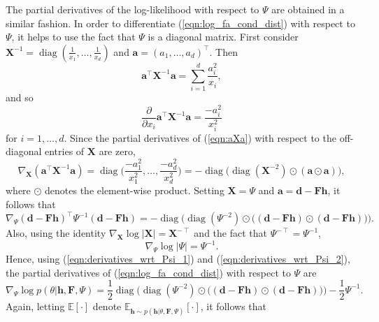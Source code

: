 \documentclass[msc,deptreport.inf]{infthesis} %
\newcommand{\matr}[1]{\mathbf{#1}}
\newcommand{\E}{\mathbb E}
\newcommand{\diag}{\mathop{\mathrm{diag}}}
\begin{document}
The partial derivatives of the log-likelihood with respect to $\Psi$ are obtained in a similar fashion. In order to differentiate (\ref{eqn:log_fa_cond_dist}) with respect to $\Psi$, it helps to use the fact that $\Psi$ is a diagonal matrix. First consider $\matr{X}^{-1} = \diag(\frac{1}{x_1}, \dots, \frac{1}{x_d})$ and $\matr{a} = (a_1, \dots, a_d)^\intercal$. Then 
\begin{equation}\label{eqn:aXa}
	\matr{a}^\intercal \matr{X}^{-1} \matr{a} = \sum_{i=1}^d \frac{a_i^2}{x_i},
\end{equation}
and so
\begin{equation}
	\frac{\partial}{\partial x_i} \matr{a}^\intercal \matr{X}^{-1} \matr{a} = \frac{-a_i^2}{x_i^2}
\end{equation}
for $i=1, \dots, d$. Since the partial derivatives of (\ref{eqn:aXa}) with respect to the off-diagonal entries of $\matr{X}$ are zero, 
\begin{equation}
	\nabla_\matr{X} (\matr{a}^\intercal \matr{X}^{-1} \matr{a}) 
	= \diag\Big({\frac{-a_1^2}{x_1^2}, \dots, \frac{-a_d^2}{x_d^2}}\Big)
	= -\diag\Big(\diag(\matr{X}^{-2}) \odot (\matr{a} \odot \matr{a})\Big),
\end{equation}
where $\odot$ denotes the element-wise product. Setting $\matr{X} = \Psi$ and $\matr{a} = \matr{d}- \matr{Fh}$, it follows that
\begin{equation}\label{eqn:derivatives_wrt_Psi_1}
	\nabla_\Psi (\matr{d} - \matr{Fh})^\intercal \Psi^{-1} (\matr{d}- \matr{Fh}) 
	= -\diag\Big(\diag(\Psi^{-2}) \odot \big((\matr{d} - \matr{Fh}) \odot (\matr{d} - \matr{Fh})\big)\Big).
\end{equation}
Also, using the identity $\nabla_\matr{X} \log |\matr{X}| = \matr{X}^{-\intercal}$ and the fact that $\Psi^{-\intercal} = \Psi^{-1}$, 
\begin{equation}\label{eqn:derivatives_wrt_Psi_2}
	\nabla_\Psi \log |\Psi|
	= \Psi^{-1}.
\end{equation}
Hence, using (\ref{eqn:derivatives_wrt_Psi_1}) and (\ref{eqn:derivatives_wrt_Psi_2}), the partial derivatives of (\ref{eqn:log_fa_cond_dist}) with respect to $\Psi$ are
\begin{equation}
	\nabla_{\Psi} \log p(\theta | \matr{h}, \matr{F}, \Psi)
	= \frac{1}{2} \diag\Big(\diag(\Psi^{-2}) \odot \big((\matr{d} - \matr{Fh}) \odot (\matr{d} - \matr{Fh})\big)\Big) - \frac{1}{2}\Psi^{-1}.
\end{equation}
Again, letting $\E[\cdot]$ denote $\E_{\matr{h} \sim p(\matr{h} | \theta, \matr{F}, \Psi)}[\cdot]$, it follows that
\end{document}

